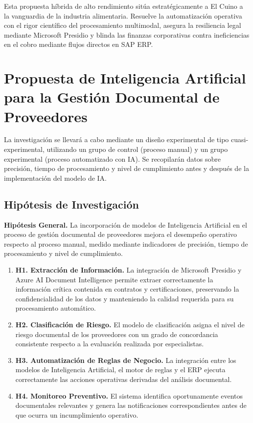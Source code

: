 \documentclass[12pt]{article}
\begin{document}
Esta propuesta híbrida de alto rendimiento sitúa estratégicamente a El Cuino a la vanguardia de la industria alimentaria. Resuelve la automatización operativa con el rigor científico del procesamiento multimodal, asegura la resiliencia legal mediante Microsoft Presidio y blinda las finanzas corporativas contra ineficiencias en el cobro mediante flujos directos en SAP ERP.


\section{Propuesta de Inteligencia Artificial para la Gestión Documental de Proveedores}
La investigación se llevará a cabo mediante un diseño experimental de tipo cuasi-experimental, utilizando un grupo de control (proceso manual) y un grupo experimental (proceso automatizado con IA). Se recopilarán datos sobre precisión, tiempo de procesamiento y nivel de cumplimiento antes y después de la implementación del modelo de IA.

\subsection{Hipótesis de Investigación}

\textbf{Hipótesis General.}
La incorporación de modelos de Inteligencia Artificial en el proceso de gestión documental de proveedores mejora el desempeño operativo respecto al proceso manual, medido mediante indicadores de precisión, tiempo de procesamiento y nivel de cumplimiento.

\begin{enumerate}
    \item \textbf{H1. Extracción de Información.}
    La integración de Microsoft Presidio y Azure AI Document Intelligence permite extraer correctamente la información crítica contenida en contratos y certificaciones, preservando la confidencialidad de los datos y manteniendo la calidad requerida para su procesamiento automático.

    \item \textbf{H2. Clasificación de Riesgo.}
    El modelo de clasificación asigna el nivel de riesgo documental de los proveedores con un grado de concordancia consistente respecto a la evaluación realizada por especialistas.

    \item \textbf{H3. Automatización de Reglas de Negocio.}
    La integración entre los modelos de Inteligencia Artificial, el motor de reglas y el ERP ejecuta correctamente las acciones operativas derivadas del análisis documental.

    \item \textbf{H4. Monitoreo Preventivo.}
    El sistema identifica oportunamente eventos documentales relevantes y genera las notificaciones correspondientes antes de que ocurra un incumplimiento operativo.
\end{enumerate}
\end{document}

